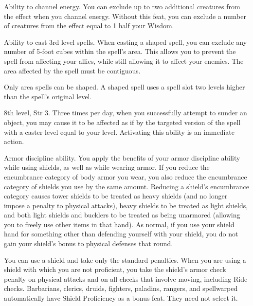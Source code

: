  Ability to channel energy.
 You can exclude up to two additional creatures from the effect when you channel energy.
 Without this feat, you can exclude a number of creatures from the effect equal to 1 \add half your Wisdom.

 Ability to cast 3rd level spells.
 When casting a shaped spell, you can exclude any number of 5-foot cubes within the spell's area. This allows you to prevent the spell from affecting your allies, while still allowing it to affect your enemies. The area affected by the spell must be contiguous.

Only area spells can be shaped. A shaped spell uses a spell slot two levels higher than the spell's original level.

\featpre 8th level, Str 3.
\featben Three times per day, when you successfully attempt to sunder an object, you may cause it to be affected as if by the targeted version of the  spell with a caster level equal to your level. Activating this ability is an immediate action.

\featpre Armor discipline ability.
\featben You apply the benefits of your armor discipline ability while using shields, as well as while wearing armor. If you reduce the encumbrance category of body armor you wear, you also reduce the encumbrance category of shields you use by the same amount. Reducing a shield's encumbrance category causes tower shields to be treated as heavy shields (and no longer impose a  penalty to physical attacks), heavy shields to be treated as light shields, and both light shields and bucklers to be treated as being unarmored (allowing you to freely use other items in that hand). As normal, if you use your shield hand for something other than defending yourself with your shield, you do not gain your shield's bonus to physical defenses that round.

 You can use a shield and take only the standard penalties.
 When you are using a shield with which you are not proficient, you take the shield's armor check penalty on physical attacks and on all checks that involve moving, including Ride checks.
 Barbarians, clerics, druids, fighters, paladins, rangers, and spellwarped automatically have Shield Proficiency as a bonus feat. They need not select it.

